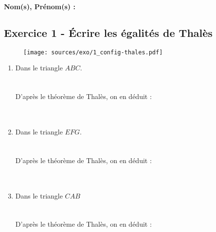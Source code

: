 \documentclass[12pt]{article}
\begin{document}

\setlength{\columnseprule}{1pt}

\textbf{Nom(s), Prénom(s) :}

\subsection*{Exercice 1 - Écrire les égalités de Thalès}

\begin{figure}[H]
  \centering
  \texttt{[image: sources/exo/1\_config-thales.pdf]}
\end{figure}

\begin{multicols}{3}
  \begin{enumerate}
  \item Dans le triangle $ABC$.\\ 
  \phantom{abc}\\
  \phantom{abc}\\
  D'après le théorème de Thalès, on en déduit :\\
   \phantom{abc}\\
  \phantom{abc}\\
  \item Dans le triangle $EFG$.\\ 
  \phantom{abc}\\
  \phantom{abc}\\
  D'après le théorème de Thalès, on en déduit :\\
  \phantom{abc}\\
  \phantom{abc}\\
  \item Dans le triangle $CAB$\\
  \phantom{abc}\\
  \phantom{abc}\\
  D'après le théorème de Thalès, on en déduit :\\
  \phantom{abc}\\
  \phantom{abc}\\
  \end{enumerate}
\end{multicols}

\vspace{0.3cm}
\noindent\hrulefill
\vspace{0.3cm}
\end{document}
